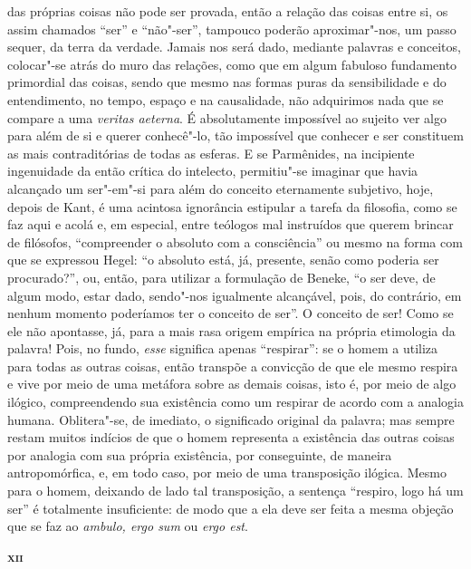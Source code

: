  das próprias coisas não pode ser provada, então a relação das coisas entre
 si, os assim chamados ``ser'' e ``não"-ser'', tampouco poderão
 aproximar"-nos, um passo sequer, da terra da verdade. Jamais nos será dado,
 mediante palavras e conceitos, colocar"-se atrás do muro das relações, como
 que em algum fabuloso fundamento primordial das coisas, sendo que mesmo nas
 formas puras da sensibilidade e do entendimento, no tempo, espaço e na
 causalidade, não adquirimos nada que se compare a uma \textit{veritas aeterna}. 
 É absolutamente impossível ao sujeito ver algo para além de si e querer conhecê"-lo, 
 tão impossível que conhecer e ser constituem as
 mais contraditórias de todas as esferas. E se Parmênides, na incipiente
 ingenuidade da então crítica do intelecto, permitiu"-se imaginar que havia
 alcançado um ser"-em"-si para além do conceito eternamente subjetivo, hoje,
 depois de Kant, é uma acintosa ignorância estipular a tarefa da filosofia,
 como se faz aqui e acolá e, em especial, entre teólogos mal instruídos que
 querem brincar de filósofos, ``compreender o absoluto com a consciência'' ou
 mesmo na forma com que se expressou Hegel: ``o absoluto está, já, presente,
 senão como poderia ser procurado?'', ou, então, para utilizar a formulação
 de Beneke, ``o ser deve, de algum modo, estar dado, sendo"-nos igualmente
 alcançável, pois, do contrário, em nenhum momento poderíamos ter o conceito
 de ser''. O conceito de ser! Como se ele não apontasse, já, para a mais rasa
 origem empírica na própria etimologia da palavra! Pois, no fundo, \textit{esse} 
 significa apenas ``respirar'': se o homem a utiliza para todas as
 outras coisas, então transpõe a convicção de que ele mesmo respira e vive
 por meio de uma metáfora sobre as demais coisas, isto é, por meio de algo
 ilógico, compreendendo sua existência como um respirar de acordo com a
 analogia humana. Oblitera"-se, de imediato, o significado original da
 palavra; mas sempre restam muitos indícios de que o homem representa a
 existência das outras coisas por analogia com sua própria existência, por
 conseguinte, de maneira antropomórfica, e, em todo caso, por meio de uma
 transposição ilógica. Mesmo para o homem, deixando de lado tal transposição,
 a sentença ``respiro, logo há um ser'' é totalmente insuficiente: de modo
 que a ela deve ser feita a mesma objeção que se faz ao \textit{ambulo, ergo
 sum} ou \textit{ergo est}.

\bigskip
\textsc{\textbf{xii}}
\bigskip


